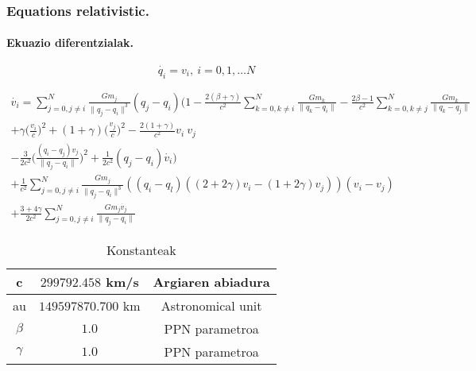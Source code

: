 \subsubsection*{Equations relativistic.}


\paragraph*{Ekuazio diferentzialak.}

\begin{equation}
\dot{q_i}=v_i, \  i=0,1,\dots N
\end{equation}

\begin{multline} 
\dot{v_i}= \sum_{j=0,j \neq i}^{N} \frac{Gm_j}{\|q_j-q_i\|^3} (q_j-q_i)
           \bigg(1- \frac{2(\beta+\gamma)}{c^2} \sum\limits_{k=0, k \neq i}^{N} \frac{Gm_k}{\|q_k-q_i\|} 
                  - \frac{2\beta-1}{c^2}        \sum\limits_{k=0, k \neq j}^{N} \frac{Gm_k}{\|q_k-q_j\|} \\
                  + \gamma \big(\frac{v_i}{c}\big)^2 + (1+\gamma) \big(\frac{v_j}{c} \big)^2 
                  - \frac{2(1+\gamma)}{c^2} v_i \ v_j \\
                  - \frac{3}{2c^2} \big(\frac{(q_i-q_j) v_j}{\|q_j-q_i\|} \big)^2+                  
                  \frac{1}{2c^2}(q_j-q_i) \dot{v_i} \bigg) \\
           + \frac{1}{c^2} \sum_{j=0,j \neq i}^{N} \frac{Gm_j}{\|q_j-q_i\|^3} 
             ((q_i-q_l) ((2+2\gamma)v_i-(1+2\gamma)v_j)) (v_i-v_j) \\
           + \frac{3+4\gamma}{2c^2} \sum_{j=0,j \neq i}^{N} \frac{Gm_j \dot{v_j}}{\|q_j-q_i\|}                                      
\end{multline}

\begin{table}[h]
\caption{Konstanteak}
\label{tab:1}       %
\begin{tabular}{ c c c }
\hline 
  c             &  $299792.458$ km/s           & Argiaren abiadura  \\
\hline
  au            &  $149597870.700$ km           & Astronomical unit  \\
\hline 	       
$\beta$          & $1.0$                       & PPN parametroa     \\
\hline 
$\gamma$         & $1.0$                       & PPN parametroa     \\
\hline
\end{tabular}
\end{table}
